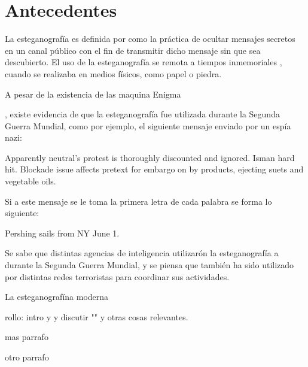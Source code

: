 \chapter{Antecedentes}
\label{antecedentes}

La esteganograf{\'{i}}a es definida por \citet{TowardTheoryStegano} como la pr{\'{a}}ctica de ocultar mensajes secretos en un canal p{\'{u}}blico con el fin de transmitir dicho mensaje sin que sea descubierto. El uso de la esteganograf{\'{i}}a se remota a tiempos inmemoriales \citet{SteganoMessagesBits}, cuando se realizaba en medios f{\'{i}}sicos, como papel o piedra.

A pesar de la existencia de las maquina Enigma


\citet{SteganoMessagesBits}, existe evidencia de que la esteganograf{\'{i}}a fue utilizada durante la Segunda Guerra Mundial, como por ejemplo, el siguiente mensaje enviado por un esp{\'{i}}a nazi:


Apparently neutral's protest is thoroughly discounted
and ignored.  Isman hard hit.  Blockade issue affects
pretext for embargo on by products, ejecting suets and
vegetable oils.

Si a este mensaje se le toma la primera letra de cada palabra se forma lo siguiente:

Pershing sails from NY June 1.

Se sabe \citet{SteganoMessagesBits} que distintas agencias de inteligencia utilizar{{\'o}}n la esteganograf{\'{i}}a a durante la Segunda Guerra Mundial, y se piensa que tambi{\'{e}}n ha sido utilizado por distintas redes terroristas para coordinar sus actividades.




La esteganograf{\'{i}n}a moderna 

rollo: intro y  y discutir "" y otras cosas relevantes.

mas parrafo

otro parrafo
